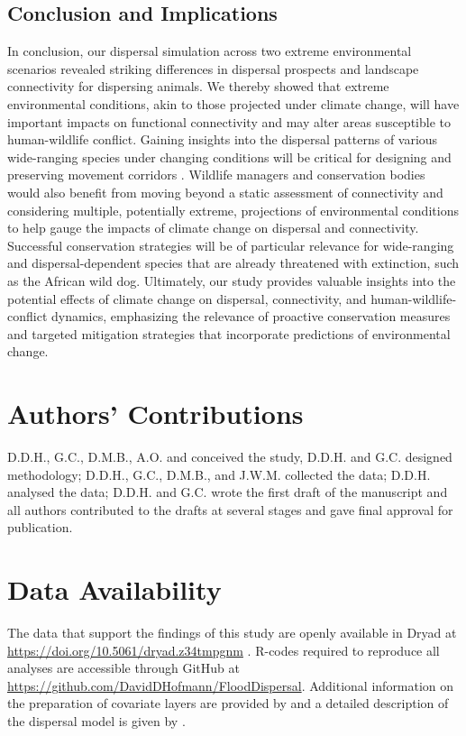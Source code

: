 \documentclass[abstract=on,10pt,a4paper,bibliography=totocnumbered]{article}
\begin{document}
\subsection{Conclusion and Implications}

In conclusion, our dispersal simulation across two extreme environmental
scenarios revealed striking differences in dispersal prospects and landscape
connectivity for dispersing animals. We thereby showed that extreme
environmental conditions, akin to those projected under climate change, will
have important impacts on functional connectivity and may alter areas
susceptible to human-wildlife conflict. Gaining insights into the dispersal
patterns of various wide-ranging species under changing conditions will be
critical for designing and preserving movement corridors \citep{Vasudev.2015}.
Wildlife managers and conservation bodies would also benefit from moving beyond
a static assessment of connectivity and considering multiple, potentially
extreme, projections of environmental conditions to help gauge the impacts of
climate change on dispersal and connectivity. Successful conservation strategies
will be of particular relevance for wide-ranging and dispersal-dependent species
that are already threatened with extinction, such as the African wild dog.
Ultimately, our study provides valuable insights into the potential effects of
climate change on dispersal, connectivity, and human-wildlife-conflict dynamics,
emphasizing the relevance of proactive conservation measures and targeted
mitigation strategies that incorporate predictions of environmental change.

\section{Authors' Contributions}

D.D.H., G.C., D.M.B., A.O. and conceived the study, D.D.H. and G.C. designed
methodology; D.D.H., G.C., D.M.B., and J.W.M. collected the data; D.D.H.
analysed the data; D.D.H. and G.C. wrote the first draft of the manuscript and
all authors contributed to the drafts at several stages and gave final approval
for publication.

\section{Data Availability}

The data that support the findings of this study are openly available in Dryad
at \url{https://doi.org/10.5061/dryad.z34tmpgnm} \citep{Hofmann.2024a}. R-codes
required to reproduce all analyses are accessible through GitHub at
\url{https://github.com/DavidDHofmann/FloodDispersal}. Additional information on
the preparation of covariate layers are provided by \citet{Hofmann.2021} and
a detailed description of the dispersal model is given by \citet{Hofmann.2023}.
\end{document}
